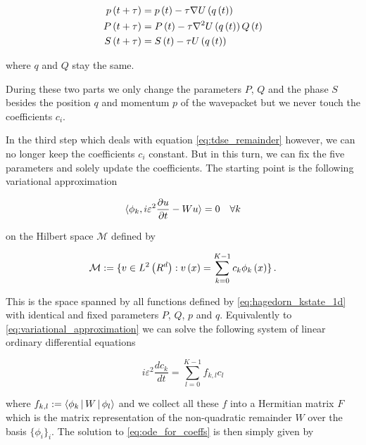 \begin{equation} \label{eq:splitting_prop_harmonic}
\begin{split}
  p\left( t+\tau \right) & = p\left( t \right) - \tau \nabla U\left( q\left( t \right) \right) \\
  P\left( t+\tau \right) & = P\left( t \right) - \tau \nabla^2 U\left( q\left( t \right) \right) Q \left( t \right) \\
  S\left( t+\tau \right) & = S\left( t \right) - \tau U\left( q\left( t \right) \right)
\end{split}
\end{equation}

where $q$ and $Q$ stay the same.

During these two parts we only change the parameters $P$, $Q$ and the phase $S$
besides the position $q$ and momentum $p$ of the wavepacket but we never touch
the coefficients $c_i$.

In the third step which deals with equation \eqref{eq:tdse_remainder} however, we
can no longer keep the coefficients $c_i$ constant. But in this turn, we can fix
the five parameters and solely update the coefficients. The starting point is
the following variational approximation

\begin{equation} \label{eq:variational_approximation}
  \langle \phi_k , i\varepsilon^2 \frac{\partial u}{\partial t} - W u \rangle = 0 \quad \forall k
\end{equation}

on the Hilbert space $\mathcal{M}$ defined by

\begin{equation} \label{eq:hagedorn_space}
  \mathcal{M} := \{v \in L^2\left( R^d \right) : v\left( x \right) = \sum_{k=0}^{K-1} c_k \phi_k\left( x \right) \} \,.
\end{equation}

This is the space spanned by all functions defined by \eqref{eq:hagedorn_kstate_1d}
with identical and fixed parameters $P$, $Q$, $p$ and $q$. Equivalently to \eqref{eq:variational_approximation}
we can solve the following system of linear ordinary differential equations

\begin{equation} \label{eq:ode_for_coeffs}
  i \varepsilon^2 \frac{d c_k}{dt} = \sum_{l=0}^{K-1} f_{k,l} c_{l}
\end{equation}

where $f_{k,l} := \Braket{\phi_k | W | \phi_l}$ and we collect all these $f$
into a Hermitian matrix $F$ which is the matrix representation of the non-quadratic
remainder $W$ over the basis $\{\phi_i\}_i$. The solution to \eqref{eq:ode_for_coeffs} is then simply given by

